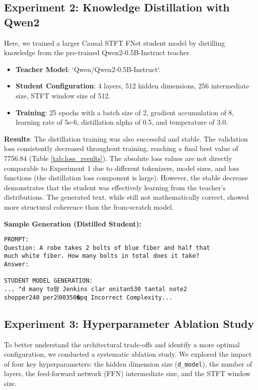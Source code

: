 \documentclass[11pt,a4paper]{article}
\begin{document}
\subsection{Experiment 2: Knowledge Distillation with Qwen2}
Here, we trained a larger Causal STFT FNet student model by distilling knowledge from the pre-trained Qwen2-0.5B-Instruct teacher.
\begin{itemize}
    \item \textbf{Teacher Model}: `Qwen/Qwen2-0.5B-Instruct`.
    \item \textbf{Student Configuration}: 4 layers, 512 hidden dimensions, 256 intermediate size, STFT window size of 512.
    \item \textbf{Training}: 25 epochs with a batch size of 2, gradient accumulation of 8, learning rate of 5e-6, distillation alpha of 0.5, and temperature of 3.0.
\end{itemize}

\textbf{Results}: The distillation training was also successful and stable. The validation loss consistently decreased throughout training, reaching a final best value of 7756.84 (Table \ref{tab:loss_results}). The absolute loss values are not directly comparable to Experiment 1 due to different tokenizers, model sizes, and loss functions (the distillation loss component is large). However, the stable decrease demonstrates that the student was effectively learning from the teacher's distributions. The generated text, while still not mathematically correct, showed more structural coherence than the from-scratch model.

\textbf{Sample Generation (Distilled Student):}
\begin{verbatim}
PROMPT:
Question: A robe takes 2 bolts of blue fiber and half that 
much white fiber. How many bolts in total does it take?
Answer:

STUDENT MODEL GENERATION:
... "d many to땀 Jenkins clar onitan530 tantal note2 
shopper240 per2ᥣ00350�pq Incorrect Complexity...
\end{verbatim}

\subsection{Experiment 3: Hyperparameter Ablation Study}
To better understand the architectural trade-offs and identify a more optimal configuration, we conducted a systematic ablation study. We explored the impact of four key hyperparameters: the hidden dimension size (\texttt{d\_model}), the number of layers, the feed-forward network (FFN) intermediate size, and the STFT window size.
\end{document}
